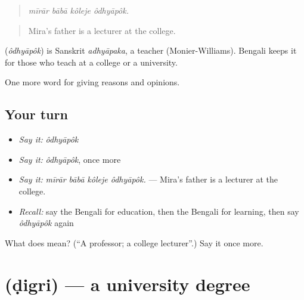 \begin{quote}
   
\end{quote}

\begin{quote}
\emph{mīrār bābā kôleje ôdhyāpôk.}
\end{quote}

\begin{quote}
Mira's father is a lecturer at the college.
\end{quote}

\begin{cousinweb}
\textbf{} (\emph{ôdhyāpôk}) is Sanskrit \emph{adhyāpaka}, a teacher (Monier-Williams). Bengali keeps it for those who teach at a college or a university.
\end{cousinweb}

\begin{grammarlens}[title={What you've built}]
One more word for giving reasons and opinions.
\end{grammarlens}

\subsection*{Your turn}
\begin{itemize}
\raggedright
  \item \emph{Say it:} \emph{ôdhyāpôk}
  \item \emph{Say it:} \emph{ôdhyāpôk}, once more
  \item \emph{Say it:} \emph{mīrār bābā kôleje ôdhyāpôk.} — Mira's father is a lecturer at the college.
  \item \emph{Recall:} say the Bengali for education, then the Bengali for learning, then say \emph{ôdhyāpôk} again
\end{itemize}

\begin{tcolorbox}[breakable,colback=teal!4,colframe=teal!35!black,title={Before you move on}]
What does  mean? (\textquotedblleft{}A professor; a college lecturer\textquotedblright{}.) Say it once more.
\end{tcolorbox}
\section[\texorpdfstring{\bn{ডিগ্রি} (ḍigri)}{ডিগ্রি (ḍigri)}]{ (ḍigri) — a university degree}

\label{lesson:BN-C361-digri}



